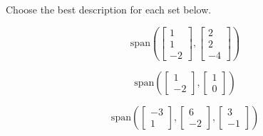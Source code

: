 \documentclass{ximera}
\begin{document}
\begin{problem}
Choose the best description for each set below.
  \begin{problem}\label{prob:describespan1}
  $$\mbox{span}\left(\begin{bmatrix}1\\1\\-2\end{bmatrix}, \begin{bmatrix}2\\2\\-4\end{bmatrix}\right)$$
  
  \begin{multipleChoice}
 \end{multipleChoice}
  \end{problem}
  
  \begin{problem}\label{prob:describespan2}
  $$\mbox{span}\left(\begin{bmatrix}1\\-2\end{bmatrix}, \begin{bmatrix}1\\0\end{bmatrix}\right)$$
  
   \begin{multipleChoice}
  
\end{multipleChoice}
  \end{problem}
  \begin{problem}\label{prob:describespan3}
  $$\mbox{span}\left(\begin{bmatrix}-3\\1\end{bmatrix}, \begin{bmatrix}6\\-2\end{bmatrix}, \begin{bmatrix}3\\-1\end{bmatrix}\right)$$
  
  \begin{multipleChoice}
\end{multipleChoice}
  \end{problem}
\end{problem}
\end{document}
